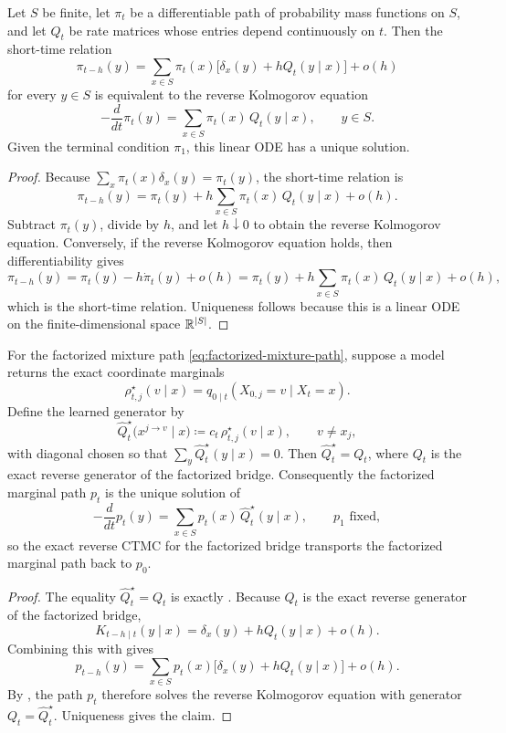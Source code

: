 \documentclass[11pt]{article}
\begin{document}
\begin{proposition}
\label{prop:reverse-kolmogorov}
Let \(S\) be finite, let \(\pi_t\) be a differentiable path of probability mass functions on \(S\), and let \(Q_t\) be rate matrices whose entries depend continuously on \(t\).
Then the short-time relation
\[
  \pi_{t-h}(y)
  =
  \sum_{x\in S}
  \pi_t(x)\bigl[\delta_x(y)+hQ_t(y\mid x)\bigr]
  +o(h)
\]
for every \(y\in S\) is equivalent to the reverse Kolmogorov equation
\[
  -\frac{d}{dt}\pi_t(y)
  =
  \sum_{x\in S}
  \pi_t(x)\,Q_t(y\mid x),
  \qquad y\in S.
\]
Given the terminal condition \(\pi_1\), this linear ODE has a unique solution.
\end{proposition}
\begin{proof}
Because \(\sum_x \pi_t(x)\delta_x(y)=\pi_t(y)\), the short-time relation is
\[
  \pi_{t-h}(y)
  =
  \pi_t(y)
  +
  h\sum_{x\in S}\pi_t(x)\,Q_t(y\mid x)
  +
  o(h).
\]
Subtract \(\pi_t(y)\), divide by \(h\), and let \(h\downarrow 0\) to obtain the reverse Kolmogorov equation.
Conversely, if the reverse Kolmogorov equation holds, then differentiability gives
\[
  \pi_{t-h}(y)
  =
  \pi_t(y)-h\dot\pi_t(y)+o(h)
  =
  \pi_t(y)
  +
  h\sum_{x\in S}\pi_t(x)\,Q_t(y\mid x)
  +
  o(h),
\]
which is the short-time relation.
Uniqueness follows because this is a linear ODE on the finite-dimensional space \(\mathbb{R}^{|S|}\).%
\end{proof}

\begin{theorem}
\label{thm:factorized-infinitesimal-exactness}
For the factorized mixture path \eqref{eq:factorized-mixture-path}, suppose a model returns the exact coordinate marginals
\[
  \rho_{t,j}^\star(v\mid x)
  =
  q_{0\mid t}(X_{0,j}=v\mid X_t=x).
\]
Define the learned generator by
\[
  \hat Q_t^\star\!\bigl(x^{j\to v}\mid x\bigr)
  \coloneqq
  c_t\,\rho_{t,j}^\star(v\mid x),
  \qquad v\neq x_j,
\]
with diagonal chosen so that \(\sum_y \hat Q_t^\star(y\mid x)=0\).
Then \(\hat Q_t^\star=Q_t\), where \(Q_t\) is the exact reverse generator of the factorized bridge.
Consequently the factorized marginal path \(p_t\) is the unique solution of
\[
  -\frac{d}{dt}p_t(y)
  =
  \sum_{x\in S} p_t(x)\,\hat Q_t^\star(y\mid x),
  \qquad
  p_1 \text{ fixed},
\]
so the exact reverse CTMC for the factorized bridge transports the factorized marginal path back to \(p_0\).
\end{theorem}
\begin{proof}
The equality \(\hat Q_t^\star=Q_t\) is exactly .
Because \(Q_t\) is the exact reverse generator of the factorized bridge,
\[
  K_{t-h\mid t}(y\mid x)
  =
  \delta_x(y)+hQ_t(y\mid x)+o(h).
\]
Combining this with  gives
\[
  p_{t-h}(y)
  =
  \sum_{x\in S}
  p_t(x)\bigl[\delta_x(y)+hQ_t(y\mid x)\bigr]
  +o(h).
\]
By , the path \(p_t\) therefore solves the reverse Kolmogorov equation with generator \(Q_t=\hat Q_t^\star\).
Uniqueness gives the claim.%
\end{proof}
\end{document}
